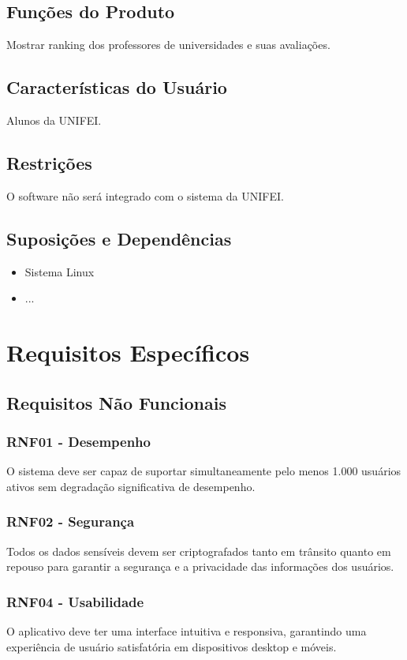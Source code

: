 \documentclass[12pt]{article}
\begin{document}
  \subsection{Funções do Produto}
  Mostrar ranking dos professores de universidades e suas avaliações.
  \subsection{Características do Usuário}
  Alunos da UNIFEI.
  \subsection{Restrições}
  O software não será integrado com o sistema da UNIFEI.
  \subsection{Suposições e Dependências}
  \begin{itemize}
      \item Sistema Linux 
      \item ... 
  \end{itemize}
  
  \section{Requisitos Específicos}
  \subsection{Requisitos Não Funcionais}
      \subsubsection{RNF01 - Desempenho}
          O sistema deve ser capaz de suportar simultaneamente pelo menos 1.000 usuários ativos sem degradação significativa de desempenho.
      \subsubsection{RNF02 - Segurança}
          Todos os dados sensíveis devem ser criptografados tanto em trânsito quanto em repouso para garantir a segurança e a privacidade das informações dos usuários.
      \subsubsection{RNF04 - Usabilidade}
          O aplicativo deve ter uma interface intuitiva e responsiva, garantindo uma experiência de usuário satisfatória em dispositivos desktop e móveis.
\end{document}
